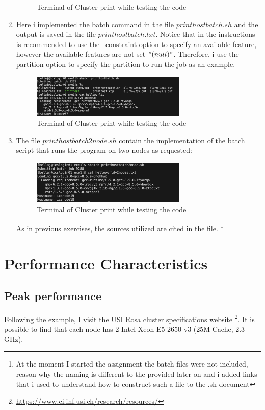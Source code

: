 \documentclass[unicode,11pt,a4paper,oneside,numbers=endperiod,openany]{scrartcl}
\begin{document}
\begin{enumerate}
\begin{figure}[h]
    \caption{Terminal of Cluster print while testing the code}
\end{figure}
\item Here i implemented the batch command in the file $printhostbatch.sh$ and the output is saved in the file $printhostbatch.txt$.
Notice that in the instructions is recommended to use the --constraint option to specify an available feature, however the available features are not set $"(null)"$. 
Therefore, i use the --partition option to specify the partition to run the job as an example.
\begin{figure}[h]
    \centering
    \includegraphics[width=0.7\textwidth]{./exercise1/exe14-1.png}
    \caption{Terminal of Cluster print while testing the code}
\end{figure}
\item The file $printhostbatch2node.sh$ contain the implementation of the batch script that runs the program on two nodes as requested:
\begin{figure}[h]
    \centering
    \includegraphics[width=0.7\textwidth]{./exercise1/exe15.png}
    \caption{Terminal of Cluster print while testing the code}
\end{figure}

As in previous exercises, the sources utilized are cited in the file. \footnote{At the moment I started the assignment the batch files were not included, reason why the naming is different to the provided later on and i added links that i used to understand how to construct such a file to the .sh document}
\end{enumerate}

\section{Performance Characteristics }
\subsection{Peak performance}
Following the example, I visit the USI Rosa cluster specifications website \footnote{\url{https://www.ci.inf.usi.ch/research/resources/}}. 
It is possible to find that each node has 2 Intel Xeon E5-2650 v3 (25M Cache, 2.3 GHz). 
\end{document}
